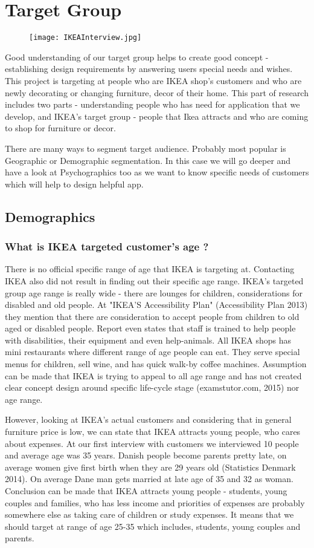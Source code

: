 \section{Target Group}
\begin{figure}[H]
\centering
\texttt{[image: IKEAInterview.jpg]}
\end{figure}
Good understanding of our target group helps to create good concept - establishing design requirements by answering users special needs and wishes. 
This project is targeting at people who are IKEA shop's customers and who are newly decorating or changing furniture, decor  of their home. This part of research includes two parts - understanding people who has need for application that we develop, and IKEA's target group - people that Ikea attracts  and who are coming to shop for furniture or decor.

There are many ways to segment target audience. Probably most popular is Geographic or Demographic segmentation. In this case we will go deeper and have a look at Psychographics too as we want to know specific needs of customers which will help to design helpful app. 
\subsection{Demographics }
\subsubsection{What is IKEA targeted customer's age ?}
There is no official specific range of age that IKEA is targeting at. Contacting IKEA also did not result in finding out their specific age range. IKEA's targeted group age range is really wide - there are lounges for children, considerations for disabled and old people. At "IKEA'S Accessibility Plan" (Accessibility Plan 2013) they mention that there are consideration to accept people from children to old aged or disabled people. Report even states that staff is trained to help people with disabilities, their equipment and even help-animals. All IKEA shops has mini restaurants where different range of age people can eat. They serve special menus for children, sell wine, and has quick walk-by coffee machines. Assumption can be made that IKEA is trying to appeal to all age range and has not created clear concept design around specific life-cycle stage (examstutor.com, 2015) nor age range. 

However, looking at IKEA's actual customers and considering that in general furniture price is low, we can state that IKEA attracts young people, who cares about expenses. At our first interview with customers we interviewed 10 people and average age was 35 years. Danish people become parents pretty late, on average women give first birth when they are 29 years old (Statistics Denmark 2014). On average Dane man gets married at late age of 35 and 32 as woman. Conclusion can be made that IKEA attracts young people - students, young couples and families, who has less income and priorities of expenses are probably somewhere else as taking care of children or study expenses. It means that we should target at range of age 25-35 which includes, students, young couples and parents.  
